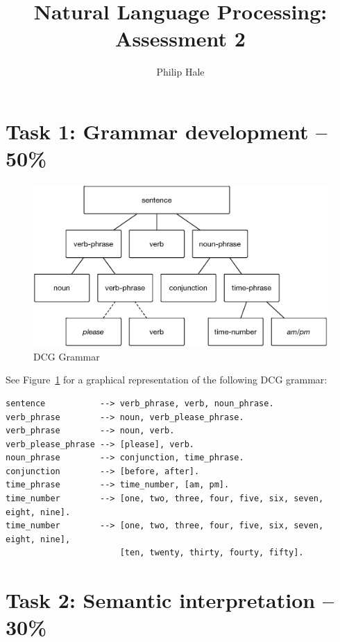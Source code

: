 \documentclass{article}
\author{Philip Hale}
\title{Natural Language Processing: Assessment 2}
\begin{document}
\maketitle

\section{Task 1: Grammar development – 50\%}

\begin{figure}
  \centering
  \includegraphics[width=\textwidth]{dcg_grammar.eps}
  \caption{DCG Grammar}
  \label{fig:dcg_grammar}
\end{figure}

See Figure~\ref{fig:dcg_grammar} for a graphical representation of the following
DCG grammar:

\begin{verbatim}
sentence           --> verb_phrase, verb, noun_phrase.
verb_phrase        --> noun, verb_please_phrase.
verb_phrase        --> noun, verb.
verb_please_phrase --> [please], verb.
noun_phrase        --> conjunction, time_phrase.
conjunction        --> [before, after].
time_phrase        --> time_number, [am, pm].
time_number        --> [one, two, three, four, five, six, seven, eight, nine].
time_number        --> [one, two, three, four, five, six, seven, eight, nine],
                       [ten, twenty, thirty, fourty, fifty].
\end{verbatim}

\section{Task 2: Semantic interpretation – 30\%}
\end{document}
